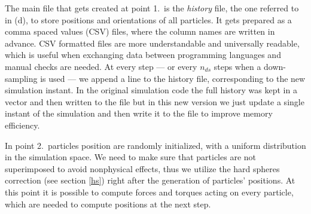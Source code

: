 \documentclass[../../master_thesis_np.tex]{subfiles}
\begin{document}
	The main file that gets created at point 1.\ is the \emph{history} file, the one referred to in (d), to store positions and orientations of all particles. 
	It gets prepared as a comma spaced values (CSV) files, where the column names are written in advance. 
	CSV formatted files are more understandable and universally readable, which is useful when exchanging data between programming languages and manual checks are needed.
	At every step --- or every $n_{ds}$ steps when a down-sampling is used --- we append a line to the history file, corresponding to the new simulation instant.
	In the original simulation code the full history was kept in a vector and then written to the file but in this new version we just update a single instant of the simulation and then write it to the file to improve memory efficiency.
	
	In point 2.\ particles position are randomly initialized, with a uniform distribution in the simulation space. 
	We need to make sure that particles are not superimposed to avoid nonphysical effects, thus we utilize the hard spheres correction (see section \ref{hs}) right after the generation of particles' positions.%
	At this point it is possible to compute forces and torques acting on every particle, which are needed to compute positions at the next step.
	
\end{document}

